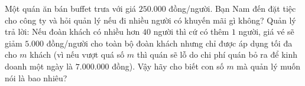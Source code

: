 \begin{ex}%
	Một quán ăn bán buffet trưa với giá $250.000$ đồng/người. Bạn Nam đến đặt tiệc cho công ty và hỏi quản lý nếu đi nhiều người có khuyến mãi gì không? Quản lý trả lời: Nếu đoàn khách có nhiều hơn $40$ người thì cứ có thêm $1$ người, giá vé sẽ giảm $5.000$ đồng/người cho toàn bộ đoàn khách nhưng chỉ được áp dụng tối đa cho $m$ khách (vì nếu vượt quá số $m$ thì quán sẽ lỗ do chi phí quán bỏ ra để kinh doanh một ngày là $7.000.000$ đồng). Vậy hãy cho biết con số $m$ mà quản lý muốn nói là bao nhiêu?
\end{ex}


